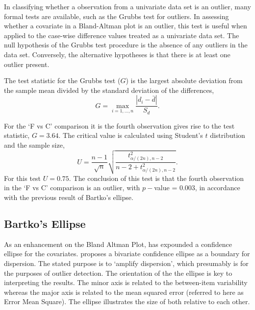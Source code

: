 \documentclass[12pt, a4paper]{report}
\theoremstyle{plain}
\theoremstyle{definition}
\theoremstyle{remark}
\begin{document}
	
	In classifying whether a observation from a univariate data set is
	an outlier, many formal tests are available, such as the Grubbs test for outliers. In assessing
	whether a covariate in a Bland-Altman plot is an outlier, this
	test is useful when applied to the case-wise difference values treated as a
	univariate data set. The null hypothesis of the Grubbs test procedure is the absence
	of any outliers in the data set. Conversely, the alternative hypotheses is that there is at least one outlier
	present.
	
	The test statistic for the Grubbs test ($G$) is the largest
	absolute deviation from the sample mean divided by the standard
	deviation of the differences,
	\begin{equation}
	G =  \displaystyle\max_{i=1,\ldots, n}\frac{\left \vert d_i -
		\bar{d}\right\vert}{S_{d}}.
	\end{equation}
	
	For the `F vs C' comparison it is the fourth observation gives
	rise to the test statistic, $G = 3.64$. The critical value is
	calculated using Student's $t$ distribution and the sample size,
	\[
	U = \frac{n-1}{\sqrt{n}} \sqrt{\frac{t_{\alpha/(2n),n-2}^2}{n - 2
			+ t_{\alpha/(2n),n-2}^2}}.
	\]
	For this test $U = 0.75$. The conclusion of this test is that the fourth observation in the `F vs C' comparison is an outlier, with $p-$value = 0.003, in accordance with the previous result of Bartko's ellipse.
	
	
\newpage
	

		\subsection{Bartko's Ellipse}
		
		As an enhancement on the Bland Altman Plot, \citet{Bartko} has
		expounded a confidence ellipse for the covariates. \citet{Bartko} proposes
		a bivariate confidence ellipse as a boundary for dispersion. The stated purpose is to `amplify dispersion', which presumably is for  the purposes of outlier detection. The orientation of the the ellipse is key to interpreting the results. The minor axis is related to the between-item variability whereas the major axis is related to the mean squared error (referred to here as Error Mean Square). The ellipse illustrates the size of both relative to each
		other. 
		
\end{document}
